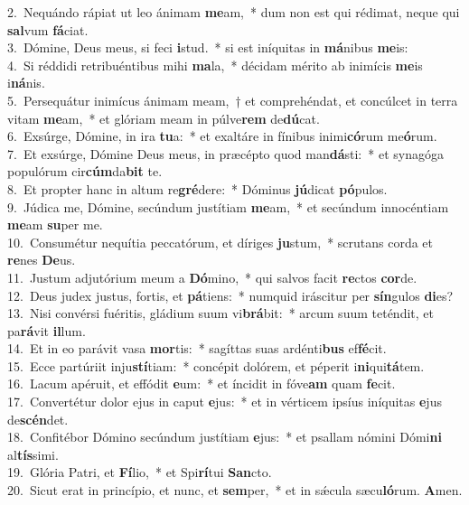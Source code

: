{2.~}Nequándo rápiat ut leo ánimam \textbf{me}am,~* dum non est qui rédimat, neque qui \textbf{sal}vum \textbf{fá}ciat.\\
{3.~}Dómine, Deus meus, si feci \textbf{i}stud.~* si est iníquitas in \textbf{má}nibus \textbf{me}is:\\
{4.~}Si réddidi retribuéntibus mihi \textbf{ma}la,~* décidam mérito ab inimícis \textbf{me}is i\textbf{ná}nis.\\
{5.~}Persequátur inimícus ánimam meam,~† et comprehéndat, et concúlcet in terra vitam \textbf{me}am,~* et glóriam meam in púlve\textbf{rem} de\textbf{dú}cat.\\
{6.~}Exsúrge, Dómine, in ira \textbf{tu}a:~* et exaltáre in fínibus inimi\textbf{có}rum me\textbf{ó}rum.\\
{7.~}Et exsúrge, Dómine Deus meus, in præcépto quod man\textbf{dá}sti:~* et synagóga populórum cir\textbf{cúm}da\textbf{bit} te.\\
{8.~}Et propter hanc in altum re\textbf{gré}dere:~* Dóminus \textbf{jú}dicat \textbf{pó}pulos.\\
{9.~}Júdica me, Dómine, secúndum justítiam \textbf{me}am,~* et secúndum innocéntiam \textbf{me}am \textbf{su}per me.\\
{10.~}Consumétur nequítia peccatórum, et díriges \textbf{ju}stum,~* scrutans corda et \textbf{re}nes \textbf{De}us.\\
{11.~}Justum adjutórium meum a \textbf{Dó}mino,~* qui salvos facit \textbf{re}ctos \textbf{cor}de.\\
{12.~}Deus judex justus, fortis, et \textbf{pá}tiens:~* numquid iráscitur per \textbf{sín}gulos \textbf{di}es?\\
{13.~}Nisi convérsi fuéritis, gládium suum vi\textbf{brá}bit:~* arcum suum teténdit, et pa\textbf{rá}vit \textbf{il}lum.\\
{14.~}Et in eo parávit vasa \textbf{mor}tis:~* sagíttas suas ardénti\textbf{bus} ef\textbf{fé}cit.\\
{15.~}Ecce partúriit inju\textbf{stí}tiam:~* concépit dolórem, et péperit i\textbf{ni}qui\textbf{tá}tem.\\
{16.~}Lacum apéruit, et effódit \textbf{e}um:~* et íncidit in fóve\textbf{am} quam \textbf{fe}cit.\\
{17.~}Convertétur dolor ejus in caput \textbf{e}jus:~* et in vérticem ipsíus iníquitas \textbf{e}jus de\textbf{scén}det.\\
{18.~}Confitébor Dómino secúndum justítiam \textbf{e}jus:~* et psallam nómini Dómi\textbf{ni} al\textbf{tís}simi.\\
{19.~}Glória Patri, et \textbf{Fí}lio,~* et Spi\textbf{rí}tui \textbf{San}cto.\\
{20.~}Sicut erat in princípio, et nunc, et \textbf{sem}per,~* et in sǽcula sæcu\textbf{ló}rum. \textbf{A}men.\\
